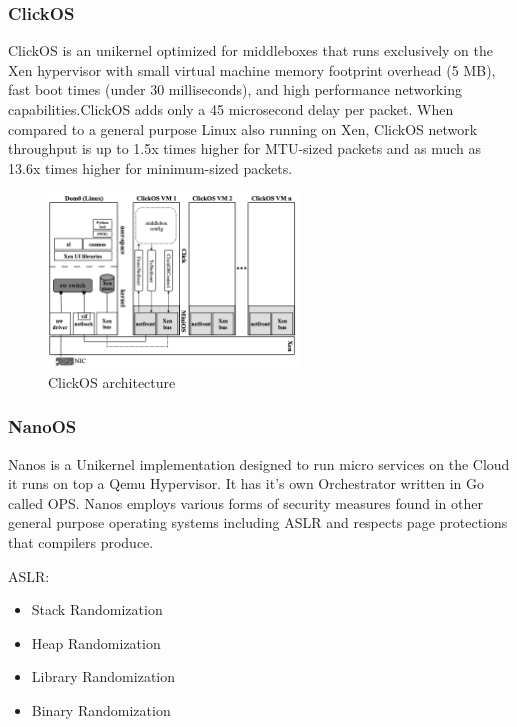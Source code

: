 \subsubsection{ClickOS}
ClickOS is an unikernel optimized for middleboxes that runs exclusively on
the Xen hypervisor with small virtual machine memory footprint overhead
(5 MB), fast boot times (under 30 milliseconds), and high performance
networking capabilities.ClickOS adds only a 45 microsecond delay per
packet. When compared to a general purpose Linux also running on Xen,
ClickOS network throughput is up to 1.5x times higher for MTU-sized packets
and as much as 13.6x times higher for minimum-sized packets. 

\begin{figure}[htbp!] 
  \centering    
  \includegraphics[width=0.6\textwidth]{ClickOSStack}
  \caption[ClickOS]{ClickOS architecture}
  \label{fig:ClickOSStack}
  \end{figure}

\subsubsection{NanoOS}
Nanos is a Unikernel implementation designed to run micro services on the 
Cloud it runs on top a Qemu Hypervisor. It has it's own Orchestrator 
written in Go called OPS. 
Nanos employs various forms of security measures found in other general purpose operating systems including ASLR and respects page protections 
that compilers produce.

ASLR:

\begin{itemize}
  \item Stack Randomization
  \item Heap Randomization
  \item Library Randomization
  \item Binary Randomization
\end{itemize}

